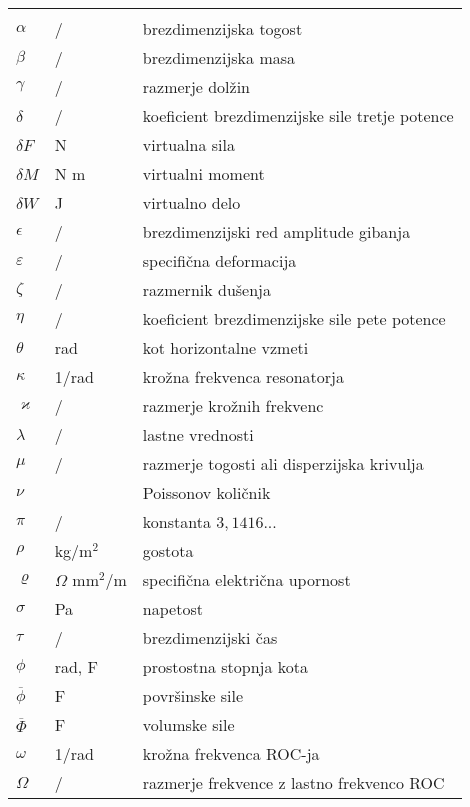 \begin{longtable}[l]{@{}p{}@{}p{}@{}p{}@{}}
    &&\\
    $\alpha$ & / & brezdimenzijska togost   \\
    $\beta$ & /  &  brezdimenzijska masa \\
    $\gamma$ & / & razmerje dolžin \\
    $\delta$ & / &  koeficient brezdimenzijske sile tretje potence \\
    $\delta F$  & N & virtualna sila \\
    $\delta M$  & N m & virtualni moment\\
    $\delta W$  & J  & virtualno delo \\
    $\epsilon$ & / & brezdimenzijski red amplitude gibanja \\
    $\varepsilon$ & / & specifična deformacija \\
    $\zeta$ & /  & razmernik dušenja  \\
    $\eta$ & / &  koeficient brezdimenzijske sile pete potence \\
    $\theta$ & rad & kot horizontalne vzmeti \\ 
    $\kappa$ & 1/rad  &  krožna frekvenca resonatorja \\
    $\varkappa$ & / & razmerje krožnih frekvenc  \\ 
    $\lambda$ & / & lastne vrednosti \\
    $\mu$ & / & razmerje togosti ali disperzijska krivulja \\
    $\nu$ &  & Poissonov količnik \\
    $\pi$     & / & konstanta $3,1416...$ \\
    $\rho$  & kg/$\text{m}^2$   & gostota\\
    $\varrho$ & $\Omega$ mm$^2$/m & specifična električna upornost \\
    $\sigma$ & Pa & napetost \\
    $\tau$ & / & brezdimenzijski čas \\
    $\phi$ & rad, F & prostostna stopnja kota \\ 
    $\overline{\phi}$ & F & površinske sile \\
    $\overline{\Phi}$ & F & volumske sile \\
    $\omega$ & 1/rad  & krožna frekvenca ROC-ja\\
    $\Omega$ & / &  razmerje frekvence z lastno frekvenco ROC \\
    
    


\end{longtable}


